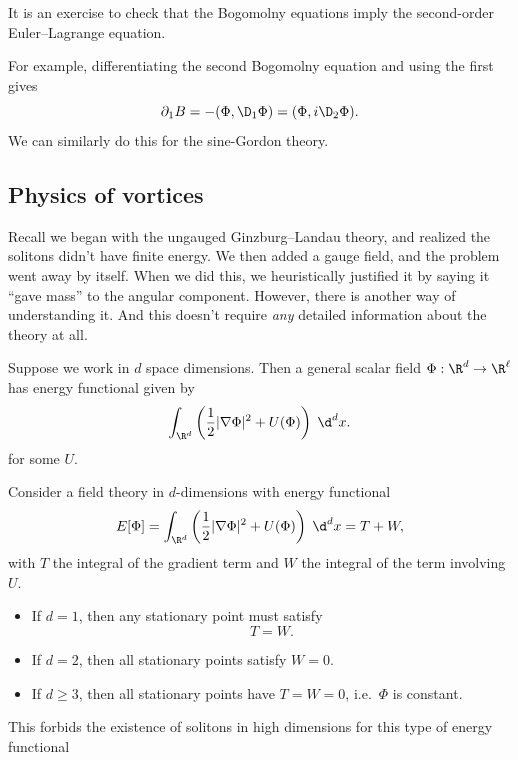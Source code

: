 \documentclass[a4paper]{article}
\begin{document}
It is an exercise to check that the Bogomolny equations imply the second-order Euler--Lagrange equation.

For example, differentiating the second Bogomolny equation and using the first gives
\[
  \partial_1 B = - (\Phi, \D_1 \Phi) = (\Phi, i \D_2 \Phi).
\]
We can similarly do this for the sine-Gordon theory.

\subsection{Physics of vortices}
Recall we began with the ungauged Ginzburg--Landau theory, and realized the solitons didn't have finite energy. We then added a gauge field, and the problem went away by itself. When we did this, we heuristically justified it by saying it ``gave mass'' to the angular component. However, there is another way of understanding it. And this doesn't require \emph{any} detailed information about the theory at all.

Suppose we work in $d$ space dimensions. Then a general scalar field $\Phi: \R^d \to \R^\ell$ has energy functional given by
\[
  \int_{\R^d} \left(\frac{1}{2} |\nabla \Phi|^2 + U(\Phi)\right)\;\d^d x.
\]
for some $U$.

\begin{thm}
  Consider a field theory in $d$-dimensions with energy functional
  \[
    E[\Phi] = \int_{\R^d}\left(\frac{1}{2} |\nabla \Phi|^2 + U(\Phi)\right)\;\d^d x = T + W,
  \]
  with $T$ the integral of the gradient term and $W$ the integral of the term involving $U$.
  \begin{itemize}
    \item If $d = 1$, then any stationary point must satisfy
      \[
        T = W.
      \]
    \item If $d = 2$, then all stationary points satisfy $W = 0$.
    \item If $d \geq 3$, then all stationary points have $T = W = 0$, i.e.\ $\Phi$ is constant.
  \end{itemize}
\end{thm}
This forbids the existence of solitons in high dimensions for this type of energy functional
\end{document}
